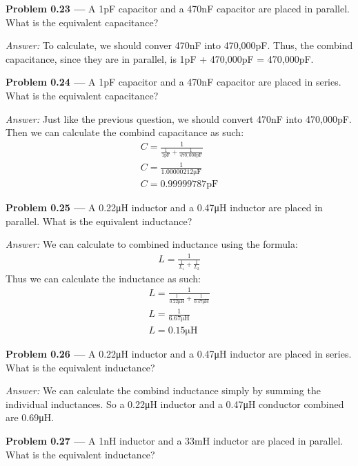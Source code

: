 \documentclass[11pt]{article}
\newcommand{\problem}[1]{\textbf{Problem #1 ---} }
\newcommand{\answer}{\textit{Answer: } }
\begin{document}
\problem{0.23} A 1\si{\pico\farad} capacitor and a 470\si{\nano\farad}
  capacitor are placed in parallel.  What is the equivalent capacitance?

\answer To calculate, we should conver 470\si{\nano\farad} into 470,000\si{\pico\farad}.
Thus, the combind capacitance, since they are in parallel, is 1\si{\pico\farad} + 470,000\si{\pico\farad} = 470,000\si{\pico\farad}.

\problem{0.24} A 1\si{\pico\farad} capacitor and a 470\si{\nano\farad}
  capacitor are placed in series.  What is the equivalent capacitance?

\answer Just like the previous question, we should convert 470\si{\nano\farad} into 470,000\si{\pico\farad}.
Then we can calculate the combind capacitance as such:
\begin{align*}
C = \frac{1}{\frac{1}{1\si{\pico\farad}}+\frac{1}{470,000\si{\pico\farad}}}\\
C = \frac{1}{1.00000212\si{\micro\farad}}\\
C = 0.99999787\si{\pico\farad}
\end{align*}

\problem{0.25} A 0.22\si{\micro\henry} inductor and a 0.47\si{\micro\henry}
  inductor are placed in parallel.  What is the equivalent inductance?

\answer We can calculate to combined inductance using the formula:
\begin{align*}
L = \frac{1}{\frac{1}{L_1}+\frac{1}{L_2}}
\end{align*}
Thus we can calculate the inductance as such:
\begin{align*}
L = \frac{1}{\frac{1}{0.22\si{\micro\henry}}+\frac{1}{0.47\si{\micro\henry}}}\\
L = \frac{1}{6.67\si{\micro\henry}}\\
L = 0.15\si{\micro\henry}
\end{align*}
 
\problem{0.26} A 0.22\si{\micro\henry} inductor and a 0.47\si{\micro\henry}
  inductor are placed in series.  What is the equivalent inductance?

\answer We can calculate the combind inductance simply by summing the individual inductances. 
So a 0.22\si{\micro\henry} inductor and a 0.47\si{\micro\henry} conductor combined are 0.69\si{\micro\henry}.

\problem{0.27} A 1\si{\nano\henry} inductor and a 33\si{\milli\henry}
  inductor are placed in parallel.  What is the equivalent inductance?
\end{document}
